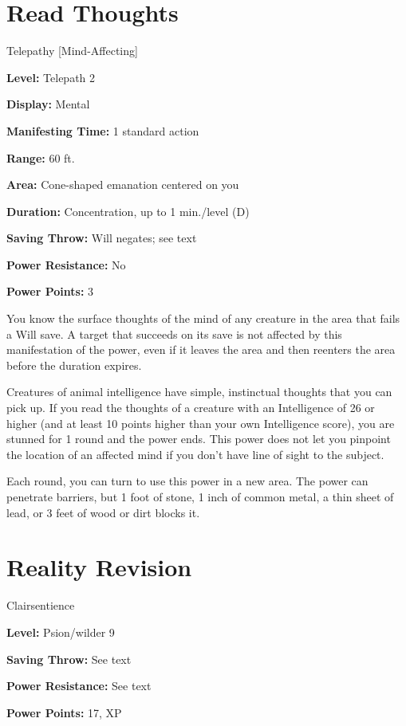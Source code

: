 \documentclass{article}
\begin{document}
\vspace{12pt}
\section*{Read Thoughts}

Telepathy [Mind-Affecting]

\textbf{Level:} Telepath 2

\textbf{Display:} Mental

\textbf{Manifesting Time:} 1 standard action

\textbf{Range:} 60 ft.

\textbf{Area:} Cone-shaped emanation centered on you

\textbf{Duration:} Concentration, up to 1 min./level (D)

\textbf{Saving Throw:} Will negates; see text

\textbf{Power Resistance:} No

\textbf{Power Points:} 3

You know the surface thoughts of the mind of any creature in the area that fails 
a Will save. A target that succeeds on its save is not affected by this manifestation 
of the power, even if it leaves the area and then reenters the area before the 
duration expires.

Creatures of animal intelligence have simple, instinctual thoughts that you can 
pick up. If you read the thoughts of a creature with an Intelligence of 26 or higher 
(and at least 10 points higher than your own Intelligence score), you are stunned 
for 1 round and the power ends. This power does not let you pinpoint the location 
of an affected mind if you don't have line of sight to the subject.

Each round, you can turn to use this power in a new area. The power can penetrate 
barriers, but 1 foot of stone, 1 inch of common metal, a thin sheet of lead, or 
3 feet of wood or dirt blocks it.

\vspace{12pt}
\section*{Reality Revision}

Clairsentience

\textbf{Level:} Psion/wilder 9

\textbf{Saving Throw:} See text

\textbf{Power Resistance:} See text

\textbf{Power Points:} 17, XP
\end{document}
